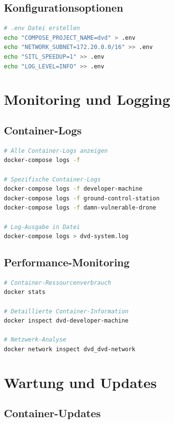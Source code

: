 \documentclass[11pt,a4paper]{article}
\begin{document}
\subsection{Konfigurationsoptionen}

\begin{lstlisting}[language=bash, caption=Umgebungsvariablen]
# .env Datei erstellen
echo "COMPOSE_PROJECT_NAME=dvd" > .env
echo "NETWORK_SUBNET=172.20.0.0/16" >> .env
echo "SITL_SPEEDUP=1" >> .env
echo "LOG_LEVEL=INFO" >> .env
\end{lstlisting}

\section{Monitoring und Logging}

\subsection{Container-Logs}

\begin{lstlisting}[language=bash, caption=Log-Monitoring]
# Alle Container-Logs anzeigen
docker-compose logs -f

# Spezifische Container-Logs
docker-compose logs -f developer-machine
docker-compose logs -f ground-control-station
docker-compose logs -f damn-vulnerable-drone

# Log-Ausgabe in Datei
docker-compose logs > dvd-system.log
\end{lstlisting}

\subsection{Performance-Monitoring}

\begin{lstlisting}[language=bash, caption=Ressourcen-Überwachung]
# Container-Ressourcenverbrauch
docker stats

# Detaillierte Container-Information
docker inspect dvd-developer-machine

# Netzwerk-Analyse
docker network inspect dvd_dvd-network
\end{lstlisting}

\section{Wartung und Updates}

\subsection{Container-Updates}
\end{document}
